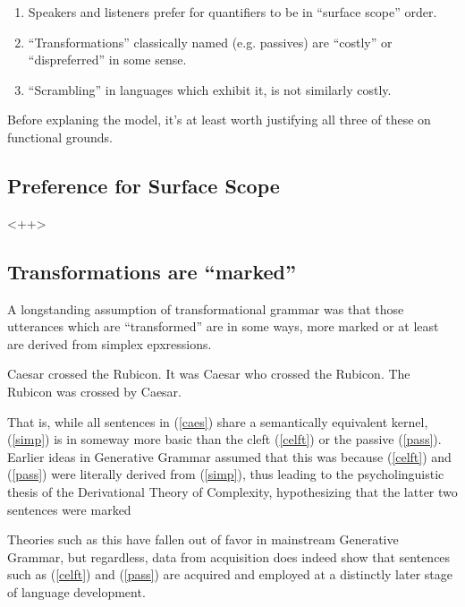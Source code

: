 \documentclass{article}
\begin{document}
\begin{enumerate}
\item Speakers and listeners prefer for quantifiers to be in ``surface scope'' order.
\item ``Transformations'' classically named (e.g. passives) are ``costly'' or ``dispreferred'' in some sense.
\item ``Scrambling'' in languages which exhibit it, is not similarly costly.
\end{enumerate}

Before explaning the model, it's at least worth justifying all three of these on functional grounds.

\subsection{Preference for Surface Scope}

<++>

\subsection{Transformations are ``marked''}

A longstanding assumption of transformational grammar was that those utterances which are ``transformed'' are in some ways, more marked or at least are derived from simplex epxressions.

\begin{exe}
	\ex\label{caes}
	\begin{xlist}
	\ex Caesar crossed the Rubicon.\label{simp}
	\ex It was Caesar who crossed the Rubicon.\label{celft}
	\ex The Rubicon was crossed by Caesar.\label{pass}
	\end{xlist}
\end{exe}

That is, while all sentences in (\ref{caes}) share a semantically equivalent kernel, (\ref{simp}) is in someway more basic than the cleft (\ref{celft}) or the passive (\ref{pass}).
Earlier ideas in Generative Grammar assumed that this was because (\ref{celft}) and (\ref{pass}) were literally derived from (\ref{simp}), thus leading to the psycholinguistic thesis of the Derivational Theory of Complexity, hypothesizing that the latter two sentences were marked

Theories such as this have fallen out of favor in mainstream Generative Grammar, but regardless, data from acquisition does indeed show that sentences such as (\ref{celft}) and (\ref{pass}) are acquired and employed at a distinctly later stage of language development.
\end{document}
